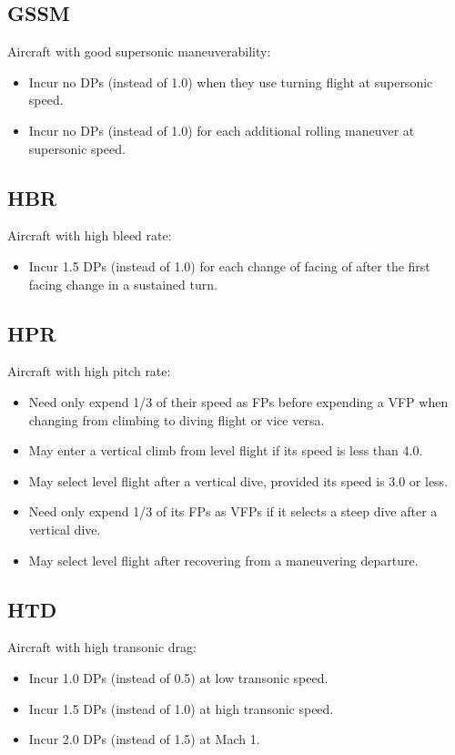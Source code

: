 \documentclass[10pt]{article}
\begin{document}
\subsection{GSSM} Aircraft with good supersonic maneuverability:
\begin{itemize}
    \item Incur no DPs (instead of 1.0) when they use turning flight at supersonic speed.
    \item Incur no DPs (instead of 1.0) for each additional rolling maneuver at supersonic speed.
\end{itemize}

\subsection{HBR} Aircraft with high bleed rate:
\begin{itemize}
    \item Incur 1.5 DPs (instead of 1.0) for each change of facing of  after the first facing change in a sustained turn.
\end{itemize}

\subsection{HPR} Aircraft with high pitch rate:
\begin{itemize}
    \item Need only expend 1/3 of their speed as FPs before expending a VFP when changing from climbing to diving flight or vice versa.
    \item May enter a vertical climb from level flight if its speed is less than 4.0.
    \item May select level flight after a vertical dive, provided its speed is 3.0 or less.
    \item Need only expend 1/3 of its FPs as VFPs if it selects a steep dive after a vertical dive.
    \item May select level flight after recovering from a maneuvering departure.
\end{itemize}

\subsection{HTD} Aircraft with high transonic drag:
\begin{itemize}
    \item Incur 1.0 DPs (instead of 0.5) at low transonic speed.
    \item Incur 1.5 DPs (instead of 1.0) at high transonic speed.
    \item Incur 2.0 DPs (instead of 1.5) at Mach 1.
\end{itemize}
\end{document}
